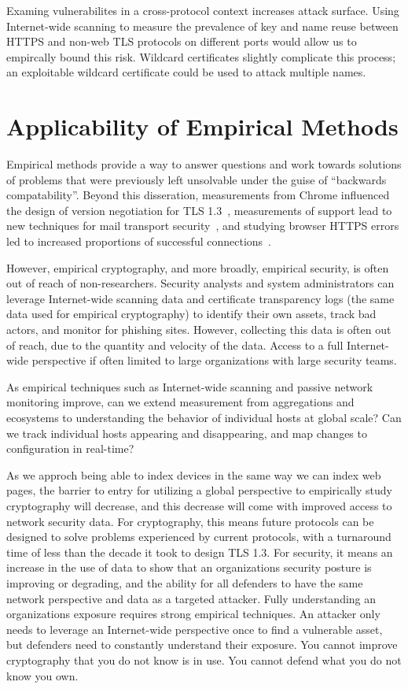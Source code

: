 Examing vulnerabilites in a cross-protocol context increases attack surface.
Using Internet-wide scanning to measure the prevalence of key and name reuse
between HTTPS and non-web TLS protocols on different ports would allow us to
empircally bound this risk. Wildcard certificates slightly complicate this
process; an exploitable wildcard certificate could be used to attack multiple
names.

\section{Applicability of Empirical Methods}

Empirical methods provide a way to answer questions and work towards
solutions of problems that were previously left unsolvable under the guise of
``backwards compatability''. Beyond this disseration, measurements from
Chrome influenced the design of version negotiation for TLS
1.3~\cite{why-tls-13-browsers-cloudflare}, measurements of \starttls support
lead to new techniques for mail transport
security~\cite{google-email-transparency-report,mail-2015,rfc8461}, and
studying browser HTTPS errors led to increased proportions of successful
connections~\cite{wild-warnings-2017}.

However, empirical cryptography, and more broadly, empirical security, is
often out of reach of non-researchers. Security analysts and system
administrators can leverage Internet-wide scanning data and certificate
transparency logs (the same data used for empirical cryptography) to identify
their own assets, track bad actors, and monitor for phishing sites. However,
collecting this data is often out of reach, due to the quantity and velocity
of the data. Access to a full Internet-wide perspective if often limited to
large organizations with large security teams.

As empirical techniques such as Internet-wide scanning and passive network
monitoring improve, can we extend measurement from aggregations and
ecosystems to understanding the behavior of individual hosts at global scale?
Can we track individual hosts appearing and disappearing, and map changes to
configuration in real-time?

As we approch being able to index devices in the same way we can index web
pages, the barrier to entry for utilizing a global perspective to empirically
study cryptography will decrease, and this decrease will come with improved
access to network security data. For cryptography, this means future
protocols can be designed to solve problems experienced by current protocols,
with a turnaround time of less than the decade it took to design TLS 1.3. For
security, it means an increase in the use of data to show that an
organizations security posture is improving or degrading, and the ability for
all defenders to have the same network perspective and data as a targeted
attacker. Fully understanding an organizations exposure requires strong
empirical techniques. An attacker only needs to leverage an Internet-wide
perspective once to find a vulnerable asset, but defenders need to constantly
understand their exposure. You cannot improve cryptography that you do not
know is in use. You cannot defend what you do not know you own.

